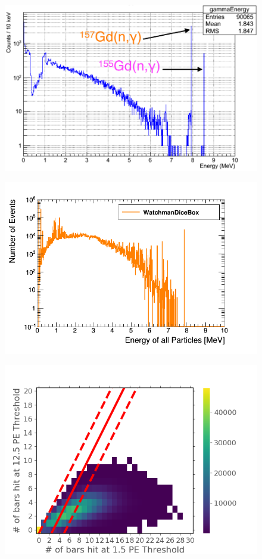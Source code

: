 \begin{figure}[H]
 \centering
 \includegraphics[width=0.7\linewidth]{Chapter4/Figs/Raster/gadolinium/FinalStateGd.png}
 \label{fig:FinalStateGd}
\end{figure}

\begin{figure}[H]
 \centering
 \includegraphics[width=0.7\linewidth]{Chapter4/Figs/Raster/gadolinium/energyOfCascadeOfCascadeGd.png}
 \label{fig:energyOfCascadeOfCascadeGd}
\end{figure}

\begin{figure}[H]
 \centering
 \includegraphics[width=0.7\linewidth]{Chapter4/Figs/Raster/gadolinium/diceBoxNeutronsSVM.png}
 \label{fig:diceBoxNeutronsSVM}
\end{figure}

